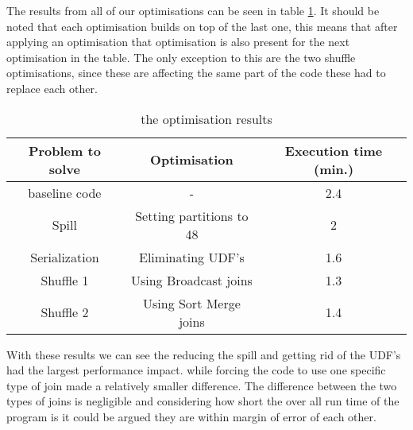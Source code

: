 The results from all of our optimisations can be seen in table \ref{tab:performance}. It should be noted that each optimisation builds on top of the last one, this means that after applying an optimisation that optimisation is also present for the next optimisation in the table. The only exception to this are the two shuffle optimisations, since these are affecting the same part of the code these had to replace each other.

\begin{table}[H]
    \centering
    \begin{tabular}{c|c|c}
        Problem to solve & Optimisation & Execution time (min.)\\
        \hline
        baseline code & - & 2.4 \\
        Spill & Setting partitions to 48 & 2\\
        Serialization & Eliminating UDF's & 1.6 \\
        Shuffle 1 & Using Broadcast joins & 1.3\\
        Shuffle 2 & Using Sort Merge joins & 1.4\\
    \end{tabular}
    \caption{the optimisation results}
    \label{tab:performance}
\end{table}

With these results we can see the reducing the spill and getting rid of the UDF's had the largest performance impact. while forcing the code to use one specific type of join made a relatively smaller difference. The difference between the two types of joins is negligible and considering how short the over all run time of the program is it could be argued they are within margin of error of each other.
